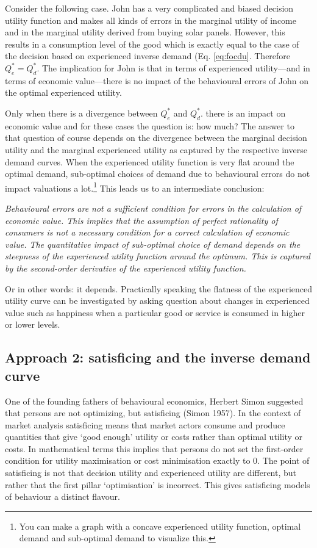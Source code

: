 \documentclass[
]{book}
\begin{document}
Consider the following case. John has a very complicated and biased decision utility function and makes all kinds of errors in the marginal utility of income and in the marginal utility derived from buying solar panels. However, this results in a consumption level of the good which is exactly equal to the case of the decision based on experienced inverse demand (Eq. \eqref{eq:focdu}. Therefore \(Q^\ast_e = Q^\ast_d\). The implication for John is that in terms of experienced utility---and in terms of economic value---there is no impact of the behavioural errors of John on the optimal experienced utility.

Only when there is a divergence between \(Q^\ast_e\) and \(Q^\ast_d\). there is an impact on economic value and for these cases the question is: how much? The answer to that question of course depends on the divergence between the marginal decision utility and the marginal experienced utility as captured by the respective inverse demand curves. When the experienced utility function is very flat around the optimal demand, sub-optimal choices of demand due to behavioural errors do not impact valuations a lot.\footnote{You can make a graph with a concave experienced utility function, optimal demand and sub-optimal demand to visualize this.} This leads us to an intermediate conclusion:

\emph{Behavioural errors are not a sufficient condition for errors in the calculation of economic value. This implies that the assumption of perfect rationality of consumers is not a necessary condition for a correct calculation of economic value. The quantitative impact of sub-optimal choice of demand depends on the steepness of the experienced utility function around the optimum. This is captured by the second-order derivative of the experienced utility function.}

Or in other words: it depends. Practically speaking the flatness of the experienced utility curve can be investigated by asking question about changes in experienced value such as happiness when a particular good or service is consumed in higher or lower levels.

\hypertarget{approach2}{%
\subsection{Approach 2: satisficing and the inverse demand curve}\label{approach2}}

One of the founding fathers of behavioural economics, Herbert Simon suggested that persons are not optimizing, but satisficing (Simon 1957). In the context of market analysis satisficing means that market actors consume and produce quantities that give `good enough' utility or costs rather than optimal utility or costs. In mathematical terms this implies that persons do not set the first-order condition for utility maximisation or cost minimisation exactly to \(0\). The point of satisficing is not that decision utility and experienced utility are different, but rather that the first pillar `optimisation' is incorrect. This gives satisficing models of behaviour a distinct flavour.
\end{document}
